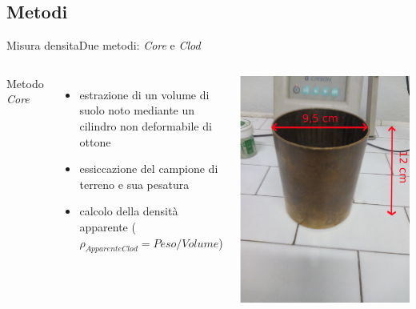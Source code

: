 \documentclass[10pt]{beamer}
\begin{document}
\subsection{Metodi}

\begin{frame}{Misura densita}{Due metodi: \emph{Core} e \emph{Clod}}
  \begin{columns}[c]
     Metodo \emph{Core}
    \begin{itemize}[<+->] 
    \item estrazione di un volume di suolo noto mediante un cilindro
      non deformabile di ottone
    \item essiccazione del campione di terreno e sua pesatura
    \item calcolo della densit\`a apparente
      ($\rho_{ApparenteClod} = Peso/Volume$)
    \end{itemize}
    \includegraphics[width=\textwidth]{../foto/cilindroOttone.jpeg}
  \end{columns}
\end{frame}
\end{document}
